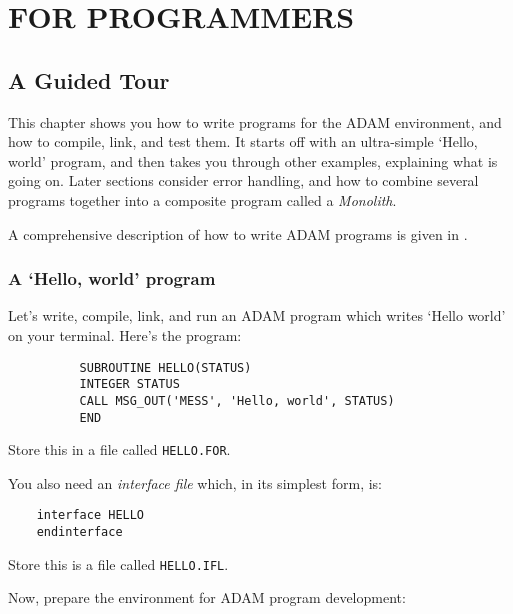 \part{FOR PROGRAMMERS}
\label{P_programmers}
\pagestyle{myheadings}

\chapter{A Guided Tour}
\label{C_simpap}

This chapter shows you how to write programs for the ADAM environment, and
how to compile, link, and test them.
It starts off with an ultra-simple `Hello, world' program, and then takes you
through other examples, explaining what is going on.
Later sections consider error handling, and how to combine several programs
together into a composite program called a {\em Monolith}.

A comprehensive description of how to write ADAM programs is given in
.

\section{A `Hello, world' program}
\label{S_prog1}

Let's write, compile, link, and run an ADAM program which writes `Hello world'
on your terminal.
Here's the program:

\begin{small}
\begin{verbatim}
          SUBROUTINE HELLO(STATUS)
          INTEGER STATUS
          CALL MSG_OUT('MESS', 'Hello, world', STATUS)
          END
\end{verbatim}
\end{small}

Store this in a file called \verb+HELLO.FOR+.

You also need an {\em interface file} which, in its simplest form, is:

\begin{small}
\begin{verbatim}
    interface HELLO
    endinterface
\end{verbatim}
\end{small}

Store this is a file called \verb+HELLO.IFL+.

Now, prepare the environment for ADAM program development:

